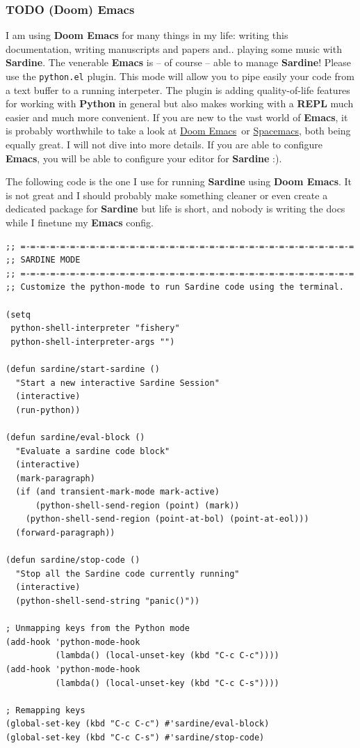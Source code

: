 \documentclass[11pt]{article}
\begin{document}
\subsubsection{{\bfseries\sffamily TODO} (Doom) Emacs}
\label{sec:org7fd1ccd}

I am using \textbf{Doom Emacs} for many things in my life: writing this documentation, writing manuscripts and papers and.. playing some music with \textbf{Sardine}. The venerable \textbf{Emacs} is -- of course -- able to manage \textbf{Sardine}! Please use the \texttt{python.el} plugin. This mode will allow you to pipe easily your code from a text buffer to a running interpeter. The plugin is adding quality-of-life features for working with \textbf{Python} in general but also makes working with a \textbf{REPL} much easier and much more convenient. If you are new to the vast world of \textbf{Emacs}, it is probably worthwhile to take a look at \href{https://github.com/doomemacs/doomemacs}{Doom Emacs} or \href{https://github.com/syl20bnr/spacemacs}{Spacemacs}, both being equally great. I will not dive into more details. If you are able to configure \textbf{Emacs}, you will be able to configure your editor for \textbf{Sardine} :).

The following code is the one I use for running \textbf{Sardine} using \textbf{Doom Emacs}. It is not great and I should probably make something cleaner or even create a dedicated package for \textbf{Sardine} but life is short, and nobody is writing the docs while I finetune my \textbf{Emacs} config.

\begin{verbatim}
;; =-=-=-=-=-=-=-=-=-=-=-=-=-=-=-=-=-=-=-=-=-=-=-=-=-=-=-=-=-=-=-=-=-=
;; SARDINE MODE
;; =-=-=-=-=-=-=-=-=-=-=-=-=-=-=-=-=-=-=-=-=-=-=-=-=-=-=-=-=-=-=-=-=-=
;; Customize the python-mode to run Sardine code using the terminal.

(setq
 python-shell-interpreter "fishery"
 python-shell-interpreter-args "")

(defun sardine/start-sardine ()
  "Start a new interactive Sardine Session"
  (interactive)
  (run-python))

(defun sardine/eval-block ()
  "Evaluate a sardine code block"
  (interactive)
  (mark-paragraph)
  (if (and transient-mark-mode mark-active)
      (python-shell-send-region (point) (mark))
    (python-shell-send-region (point-at-bol) (point-at-eol)))
  (forward-paragraph))

(defun sardine/stop-code ()
  "Stop all the Sardine code currently running"
  (interactive)
  (python-shell-send-string "panic()"))

; Unmapping keys from the Python mode
(add-hook 'python-mode-hook
          (lambda() (local-unset-key (kbd "C-c C-c"))))
(add-hook 'python-mode-hook
          (lambda() (local-unset-key (kbd "C-c C-s"))))

; Remapping keys
(global-set-key (kbd "C-c C-c") #'sardine/eval-block)
(global-set-key (kbd "C-c C-s") #'sardine/stop-code)
\end{verbatim}
\end{document}
